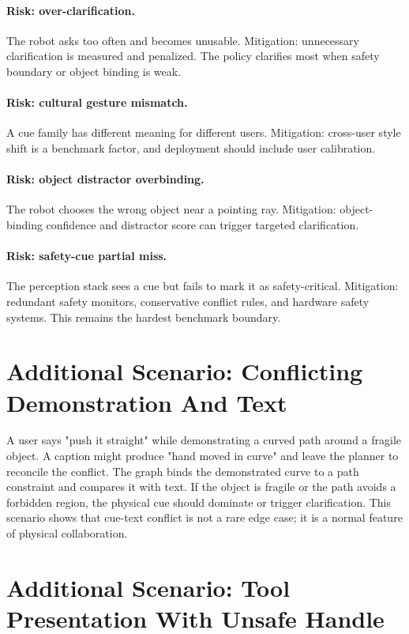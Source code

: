 \documentclass{article}
\begin{document}
\paragraph{Risk: over-clarification.}
The robot asks too often and becomes unusable. Mitigation: unnecessary clarification is measured and penalized. The policy clarifies most when safety boundary or object binding is weak.

\paragraph{Risk: cultural gesture mismatch.}
A cue family has different meaning for different users. Mitigation: cross-user style shift is a benchmark factor, and deployment should include user calibration.

\paragraph{Risk: object distractor overbinding.}
The robot chooses the wrong object near a pointing ray. Mitigation: object-binding confidence and distractor score can trigger targeted clarification.

\paragraph{Risk: safety-cue partial miss.}
The perception stack sees a cue but fails to mark it as safety-critical. Mitigation: redundant safety monitors, conservative conflict rules, and hardware safety systems. This remains the hardest benchmark boundary.

\section{Additional Scenario: Conflicting Demonstration And Text}

A user says "push it straight" while demonstrating a curved path around a fragile object. A caption might produce "hand moved in curve" and leave the planner to reconcile the conflict. The graph binds the demonstrated curve to a path constraint and compares it with text. If the object is fragile or the path avoids a forbidden region, the physical cue should dominate or trigger clarification. This scenario shows that cue-text conflict is not a rare edge case; it is a normal feature of physical collaboration.

\section{Additional Scenario: Tool Presentation With Unsafe Handle}
\end{document}
